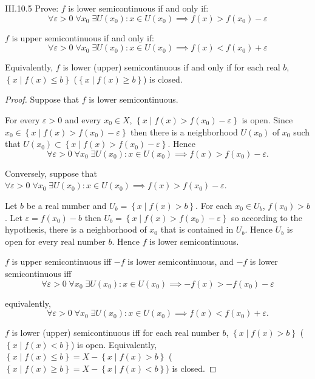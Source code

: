 \begin{problem}{III.10.5}
Prove: \(f\) is lower semicontinuous if and only if:
\[
	\forall \varepsilon > 0\; \forall x_{0}\; \exists U(x_{0}): x \in U(x_{0}) \implies f(x) > f(x_{0}) - \varepsilon
\]

\(f\) is upper semicontinuous if and only if:
\[
	\forall \varepsilon > 0\; \forall x_{0}\; \exists U(x_{0}): x \in U(x_{0}) \implies f(x) < f(x_{0}) + \varepsilon
\]

Equivalently, \(f\) is lower (upper) semicontinuous if and only if for each real \(b\), \( \left\{ x \mid f(x) \le b \right\} \) (\( \left\{ x \mid f(x) \ge b \right\} \)) is closed.
\end{problem}

\begin{proof}
	Suppose that \( f \) is lower semicontinuous.

	For every \( \varepsilon > 0 \) and every \( x_{0} \in X \), \( \left\{ x \mid f(x) > f(x_{0}) - \varepsilon \right\} \) is open. Since \( x_{0} \in \left\{ x \mid f(x) > f(x_{0}) - \varepsilon \right\} \) then there is a neighborhood \( U(x_{0}) \) of \( x_{0} \) such that \( U(x_{0}) \subset \left\{ x \mid f(x) > f(x_{0}) - \varepsilon \right\} \). Hence
	\[
		\forall \varepsilon > 0\; \forall x_{0}\; \exists U(x_{0}): x \in U(x_{0}) \implies f(x) > f(x_{0}) - \varepsilon.
	\]

	Conversely, suppose that \( \forall \varepsilon > 0\; \forall x_{0}\; \exists U(x_{0}): x \in U(x_{0}) \implies f(x) > f(x_{0}) - \varepsilon \).

	Let \( b \) be a real number and \( U_{b} = \left\{ x \mid f(x) > b \right\} \). For each \( x_{0} \in U_{b} \), \( f(x_{0}) > b \). Let \( \varepsilon = f(x_{0}) - b \) then \( U_{b} = \left\{ x \mid f(x) > f(x_{0}) - \varepsilon \right\} \) so according to the hypothesis, there is a neighborhood of \( x_{0} \) that is contained in \( U_{b} \). Hence \( U_{b} \) is open for every real number \(b\). Hence \( f \) is lower semicontinuous.

	\bigskip
	\(f\) is upper semicontinuous iff \( -f \) is lower semicontinuous, and \( -f \) is lower semicontinuous iff
	\[
		\forall \varepsilon > 0\; \forall x_{0}\; \exists U(x_{0}): x \in U(x_{0}) \implies -f(x) > -f(x_{0}) - \varepsilon
	\]

	equivalently,
	\[
		\forall \varepsilon > 0\; \forall x_{0}\; \exists U(x_{0}): x \in U(x_{0}) \implies f(x) < f(x_{0}) + \varepsilon.
	\]

	\bigskip
	\( f \) is lower (upper) semicontinuous iff for each real number \(b\), \( \left\{ x \mid f(x) > b \right\} \) (\( \left\{ x \mid f(x) < b \right\} \)) is open. Equivalently, \(  \left\{ x \mid f(x) \le b \right\} = X - \left\{ x \mid f(x) > b \right\} \) (\( \left\{ x \mid f(x) \ge b \right\} = X - \left\{ x \mid f(x) < b \right\} \)) is closed.
\end{proof}

